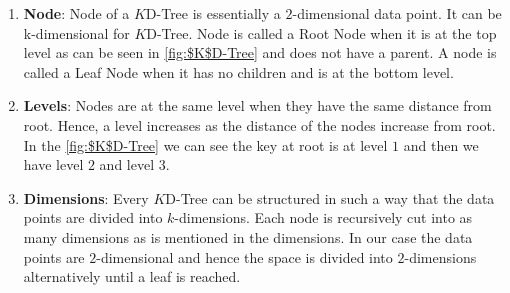 \begin{enumerate}
    \item\textbf{Node}: Node of a $K$D-Tree is essentially a $2$-dimensional data point. It can be k-dimensional for $K$D-Tree. Node is called a Root Node when it is at the top level as can be seen in \ref{fig:$K$D-Tree} and does not have a parent. A node is called a Leaf Node when it has no children and is at the bottom level. 
    
    \item\textbf{Levels}: Nodes are at the same level when they have the same distance from root. Hence, a level increases as the distance of the nodes increase from root. In the \ref{fig:$K$D-Tree} we can see the key at root is at level $1$ and then we have level $2$ and level $3$. 
    \item\textbf{Dimensions}: Every $K$D-Tree can be structured in such a way that the data points are divided into $k$-dimensions. Each node is recursively cut into as many dimensions as is mentioned in the dimensions. In our case the data points are $2$-dimensional and hence the space is divided into $2$-dimensions alternatively until a leaf is reached.
\end{enumerate}
    
\begin{algorithm}[H]
    \SetAlgoLined
\end{algorithm}


